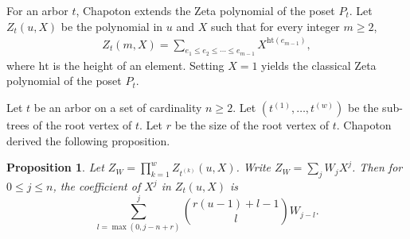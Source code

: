 \documentclass[reqno, 12pt]{article}
\newtheorem{prop}[thm]{Proposition}
\theoremstyle{mydefinition}
\theoremstyle{myremark}
\begin{document}
For an arbor $t$, Chapoton extends the Zeta polynomial of the poset $P_t$.
Let $Z_t(u,X)$ be the polynomial in $u$ and $X$ such that for every integer $m\geq 2$,
\begin{align*}
Z_t(m,X)=\sum_{e_1 \leq e_2 \leq \cdots \leq e_{m-1}} X^{\mathrm{ht}(e_{m-1})},
\end{align*}
where $\mathrm{ht}$ is the height of an element.
Setting $X=1$ yields the classical Zeta polynomial of the poset $P_t$. 

Let $t$ be an arbor on a set of cardinality $n\geq 2$. Let $(t^{(1)},\ldots,t^{(w)})$ be the sub-trees of the root vertex of $t$. Let $r$ be the size of the root vertex of $t$. 
Chapoton \cite{Chapoton} derived the following proposition.

\begin{prop}{\em \cite[Proposition 2.7]{Chapoton}}\label{Chap2.7}
Let $Z_{W}=\prod\limits_{k=1}^{w}Z_{t^{(k)}}(u,X)$.
Write $Z_{W}=\sum\limits_{j}W_{j}X^{j}$. Then for $0\le j\le n$, the coefficient of $X^{j}$ in $Z_{t}(u,X)$ is
$$ \sum_{l=\max(0,j-n+r)}^{j}\binom{r(u-1)+l-1}{l}W_{j-l}.$$
\end{prop}
\end{document}

